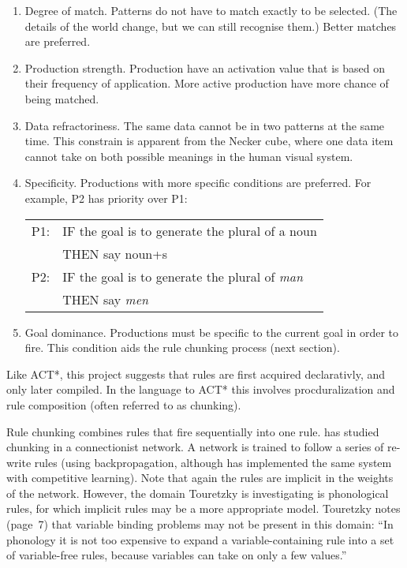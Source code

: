 \begin{enumerate}
\item Degree of match. Patterns do not have to match exactly to be
selected. (The details of the world change, but we can still
recognise them.)  Better matches are preferred.

\item Production strength. Production have an activation value that
is based on their frequency of application.  More active production
have more chance of being matched.

\item Data refractoriness. The same data cannot be in two patterns
at the same time. This constrain is apparent from the Necker cube, where
one data item cannot take on both possible meanings in the human
visual system.

\item Specificity. Productions with more specific conditions
are preferred. For example, P2 has priority over P1:
\begin{center}
\begin{tabular}{rl}
P1: & IF the goal is to generate the plural of a noun\\
    & THEN say noun+s\medskip\\

P2: & IF the goal is to generate the plural of {\em man}\\
    & THEN say {\em men}
\end{tabular}
\end{center}

\item Goal dominance. Productions must be specific to the current
goal in order to fire.  This condition aids the rule chunking process
(next section).
\end{enumerate}


 Like ACT*, this project suggests that
rules are first acquired declarativly, and only later compiled.
In the language to ACT* this involves procduralization and rule
composition (often referred to as chunking).

Rule chunking combines rules that fire sequentially into one
rule.   has studied chunking in a connectionist
network.  A network is trained to follow a series of re-write rules
(using backpropagation, although  has implemented
the same system with competitive learning).
Note that again the rules are implicit in the weights of the network.
However, the domain Touretzky is investigating is phonological rules,
for which implicit rules may be a more appropriate model.  Touretzky
notes (page~7) that variable binding problems may not be present
in this domain: ``In phonology it is not too expensive to expand
a variable-containing rule into a set of variable-free rules,
because variables can take on only a few values.''

